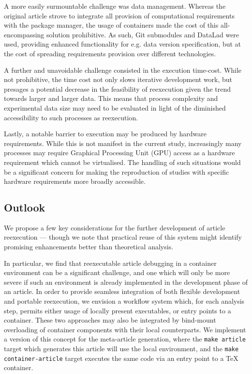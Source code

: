 A more easily surmountable challenge was data management.
Whereas the original article strove to integrate all provision of computational requirements with the package manager, the usage of containers made the cost of this all-encompassing solution prohibitive.
As such, Git submodules and DataLad were used, providing enhanced functionality for e.g. data version specification, but at the cost of spreading requirements provision over different technologies.

A further and unavoidable challenge consisted in the execution time-cost.
While not prohibitive, the time cost not only slows iterative development work, but presages a potential decrease in the feasibility of reexecution given the trend towards larger and larger data.
This means that process complexity and experimental data size may need to be evaluated in light of the diminished accessibility to such processes as reexecution.

Lastly, a notable barrier to execution may be produced by hardware requirements.
While this is not manifest in the current study, increasingly many processes may require Graphical Processing Unit (GPU) access as a hardware requirement which cannot be virtualised.
The handling of such situations would be a significant concern for making the reproduction of studies with specific hardware requirements more broadly accessible.

\subsection{Outlook}

We propose a few key considerations for the further development of article reexecution — though we note that practical reuse of this system might identify promising enhancements better than theoretical analysis.

In particular, we find that reexecutable article debugging in a container environment can be a significant challenge, and one which will only be more severe if such an environment is already implemented in the development phase of an article.
In order to provide seamless integration of both flexible development and portable reexecution, we envision a workflow system which, for each analysis step, permits either usage of locally present executables, or entry points to a container.
These two approaches may also be integrated by bind-mount overloading of container components with their local counterparts.
We implement a version of this concept for the meta-article generation, where the \texttt{make article} target which generates this article will use the local environment, and the \texttt{make container-article} target executes the same code via an entry point to a \TeX{} container.

